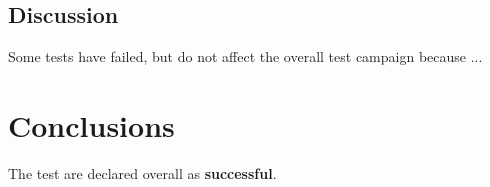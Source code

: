 \subsection{Discussion}
Some tests have failed, but do not affect the overall test campaign because ...

\section{Conclusions}

The test are declared overall as {\bf successful}.
